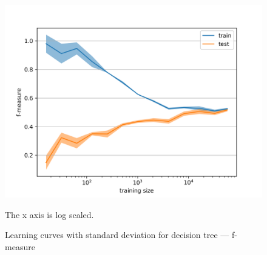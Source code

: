 \begin{figure}[h]\centering
\includegraphics[width=130mm]{figures/lc3_fm.png}
\caption{Learning curves with standard deviation for decision tree --- f-measure}\label{fig:l_curves3_f_measure}
The x axis is log scaled.
\end{figure}
